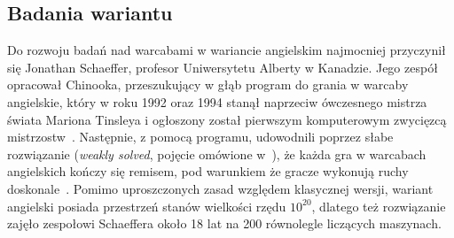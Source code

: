 \FloatBarrier

\subsection{Badania wariantu}

Do rozwoju badań nad warcabami w wariancie angielskim najmocniej przyczynił się Jonathan Schaeffer, profesor Uniwersytetu Alberty w Kanadzie. Jego zespół opracował Chinooka, przeszukujący w głąb program do grania w warcaby angielskie, który w roku 1992 oraz 1994 stanął naprzeciw ówczesnego mistrza świata Mariona Tinsleya i ogłoszony został pierwszym komputerowym zwycięzcą mistrzostw~\cite{Chinook}. Następnie, z pomocą programu, udowodnili poprzez słabe rozwiązanie (\textit{weakly solved}, pojęcie omówione w~\cite{Solving}), że każda gra w warcabach angielskich kończy się remisem, pod warunkiem że gracze wykonują ruchy doskonale~\cite{Solved}. Pomimo uproszczonych zasad względem klasycznej wersji, wariant angielski posiada przestrzeń stanów wielkości rzędu $10^{20}$, dlatego też rozwiązanie zajęło zespołowi Schaeffera około 18 lat na 200 równolegle liczących maszynach.



